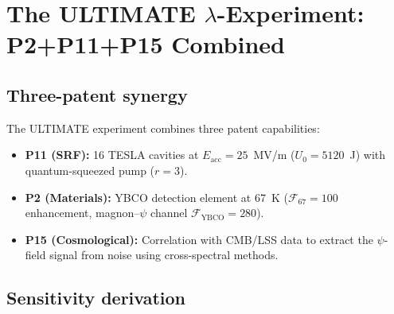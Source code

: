 \documentclass[11pt]{article}
\theoremstyle{definition}
\theoremstyle{remark}
\begin{document}
\section{The ULTIMATE $\lambda$-Experiment: P2+P11+P15 Combined}
\label{sec:ultimate-experiment}

\subsection{Three-patent synergy}

The ULTIMATE experiment combines three patent capabilities:
\begin{itemize}[nosep]
\item \textbf{P11 (SRF):} 16 TESLA cavities at $E_{\mathrm{acc}} = 25$~MV/m
($U_0 = 5120$~J) with quantum-squeezed pump ($r=3$).
\item \textbf{P2 (Materials):} YBCO detection element at 67~K
($\mathcal{F}_{67} = 100$ enhancement, magnon--$\psi$ channel
$\mathcal{F}_{\mathrm{YBCO}} = 280$).
\item \textbf{P15 (Cosmological):} Correlation with CMB/LSS data to
extract the $\psi$-field signal from noise using cross-spectral methods.
\end{itemize}

\subsection{Sensitivity derivation}
\end{document}
